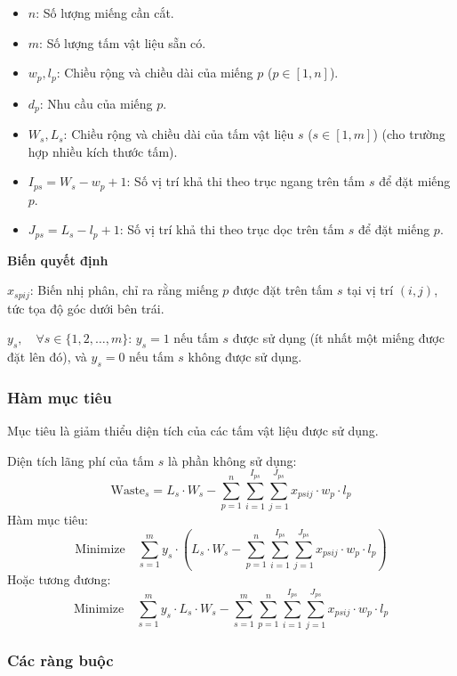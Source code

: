 \begin{itemize}
    \item \( n \): Số lượng miếng cần cắt.
    \item \( m \): Số lượng tấm vật liệu sẵn có.
    \item \( w_p, l_p \): Chiều rộng và chiều dài của miếng \( p \) (\( p \in [1, n] \)).
    \item \( d_p \): Nhu cầu của miếng \( p \).
    \item \( W_s, L_s \): Chiều rộng và chiều dài của tấm vật liệu \( s \) (\( s \in [1, m] \)) (cho trường hợp nhiều kích thước tấm).
    \item \( I_{ps} = W_s - w_p + 1 \): Số vị trí khả thi theo trục ngang trên tấm \( s \) để đặt miếng \( p \).
    \item \( J_{ps} = L_s - l_p + 1 \): Số vị trí khả thi theo trục dọc trên tấm \( s \) để đặt miếng \( p \).
\end{itemize}

\textbf{Biến quyết định}

\( x_{spij} \): Biến nhị phân, chỉ ra rằng miếng \( p \) được đặt trên tấm \( s \) tại vị trí \((i, j)\), tức tọa độ góc dưới bên trái.

\( y_s , \quad \forall s \in \{1, 2, \dots, m\} \): \( y_s = 1 \) nếu tấm \( s \) được sử dụng (ít nhất một miếng được đặt lên đó), và \( y_s = 0 \) nếu tấm \( s \) không được sử dụng.

\subsubsection{Hàm mục tiêu}

Mục tiêu là giảm thiểu diện tích của các tấm vật liệu được sử dụng.

Diện tích lãng phí của tấm \( s \) là phần không sử dụng:  
\[
\text{Waste}_s = L_s \cdot W_s - \sum_{p=1}^n \sum_{i=1}^{I_{ps}} \sum_{j=1}^{J_{ps}} x_{psij} \cdot w_p \cdot l_p
\]  
Hàm mục tiêu:  
\[
\text{Minimize} \quad \sum_{s=1}^m y_s \cdot \left(L_s \cdot W_s - \sum_{p=1}^n \sum_{i=1}^{I_{ps}} \sum_{j=1}^{J_{ps}} x_{psij} \cdot w_p \cdot l_p \right)
\]  
Hoặc tương đương:  
\[
\text{Minimize} \quad \sum_{s=1}^m y_s \cdot L_s \cdot W_s - \sum_{s=1}^m \sum_{p=1}^n \sum_{i=1}^{I_{ps}} \sum_{j=1}^{J_{ps}} x_{psij} \cdot w_p \cdot l_p
\]

\subsubsection{Các ràng buộc}

